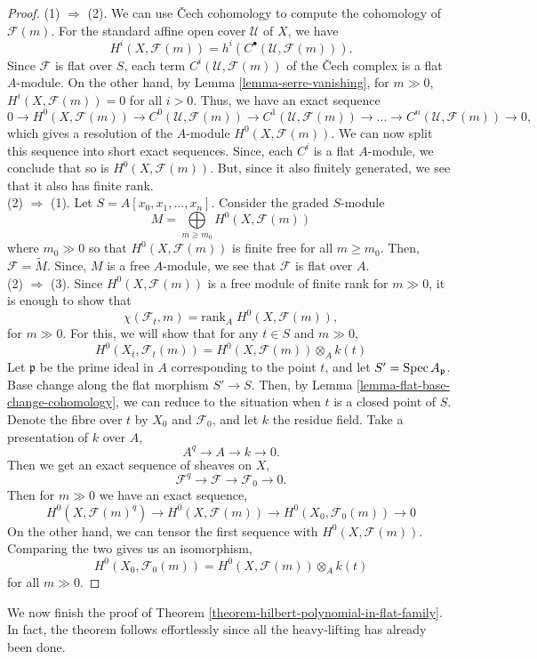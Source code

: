 \documentclass[11pt]{amsart}
\newcommand{\Spec}{{\rm Spec \,}}
\renewcommand{\tilde}{\widetilde}
\newcommand{\sF}{{\mathcal F}}
\newcommand{\sU}{{\mathcal U}}
\theoremstyle{definition}
\begin{document}
\begin{proof}
	(1) $\Rightarrow$ (2). We can use \v{C}ech cohomology to compute the cohomology of $\sF(m)$. For the standard affine open cover $\sU$ of $X$, we have
	\[H^i(X,\sF(m))=h^i(C^{\bullet}(\sU,\sF(m))).\]
	Since $\sF$ is flat over $S$, each term $C^{i}(\sU,\sF(m))$ of the \v{C}ech complex is a flat $A$-module. On the other hand, by Lemma \ref{lemma-serre-vanishing}, for $m\gg 0$, $H^i(X,\sF(m))=0$ for all $i>0$. Thus, we have an exact sequence
	\[0\rightarrow H^0(X,\sF(m))\rightarrow C^{0}(\sU,\sF(m))\rightarrow C^{1}(\sU,\sF(m))\rightarrow \ldots \rightarrow C^{n}(\sU,\sF(m))\rightarrow 0,\]
	which gives a resolution of the $A$-module $H^0(X,\sF(m))$. We can now split this sequence into short exact sequences. Since, each $C^i$ is a flat $A$-module, we conclude that so is $H^0(X,\sF(m))$. But, since it also finitely generated, we see that it also has finite rank.\\
	(2) $\Rightarrow$ (1). Let $S=A[x_0,x_1,\ldots,x_n]$. Consider the graded $S$-module
	\[M=\underset{m\geq m_0}{\bigoplus}H^0(X,\sF(m))\]
	where $m_0\gg 0$ so that $H^0(X,\sF(m))$ is finite free for all $m\geq m_0$. Then, $\sF=\tilde{M}$. Since, $M$ is a free $A$-module, we see that $\sF$ is flat over $A$.\\
	(2) $\Rightarrow$ (3). Since $H^0(X,\sF(m))$ is a free module of finite rank for $m\gg 0$, it is enough to show that
	\[\chi(\sF_t,m)=\text{rank}_A\; H^0(X,\sF(m)),\]
	for $m\gg 0$.	For this, we will show that for any $t\in S$ and $m\gg 0$,
	\[H^0(X_t,\sF_t(m))=H^0(X,\sF(m)) \otimes_A k(t)\]
	Let $\mathfrak{p}$ be the prime ideal in $A$ corresponding to the point $t$, and let $S'=\Spec A_{\mathfrak{p}}$. Base change along the flat morphism $S'\rightarrow S$. Then, by Lemma \ref{lemma-flat-base-change-cohomology}, we can reduce to the situation when $t$ is a closed point of $S$. Denote the fibre over $t$ by $X_0$ and $\sF_0$, and let $k$ the residue field. Take a presentation of $k$ over $A$,
	\[A^q\rightarrow A\rightarrow k\rightarrow 0.\]
	Then we get an exact sequence of sheaves on $X$,
	\[\sF^q\rightarrow \sF \rightarrow \sF_0\rightarrow 0.\]
	Then for $m\gg 0$ we have an exact sequence,
	\[H^0(X,\sF(m)^q)\rightarrow H^0(X,\sF(m))\rightarrow H^0(X_0,\sF_0(m)) \rightarrow 0\]
	On the other hand, we can tensor the first sequence with $H^0(X,\sF(m))$. Comparing the two gives us an isomorphism,
	\[H^0(X_0,\sF_0(m))=H^0(X,\sF(m)) \otimes_A k(t)\]
	for all $m\gg 0$.
\end{proof}

We now finish the proof of Theorem \ref{theorem-hilbert-polynomial-in-flat-family}. In fact, the theorem follows effortlessly since all the heavy-lifting has already  been done.
\end{document}
